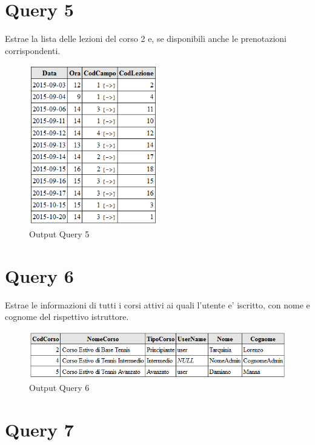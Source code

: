\section{Query 5}
Estrae la lista delle lezioni del corso 2 e, se disponibili  anche le prenotazioni corrispondenti.\\



\begin{figure}[H]
 \centering
  \includegraphics[width=0.5\textwidth]{images/Query5.PNG}
\caption{Output Query 5}
\end{figure}

\section{Query 6}

Estrae le informazioni di tutti i corsi attivi ai quali l'utente e' iscritto, con nome e cognome del rispettivo istruttore.\\



\begin{figure}[H]
 \centering
  \includegraphics[width=\textwidth]{images/Query6.PNG}
\caption{Output Query 6}
\end{figure}

\section{Query 7}

